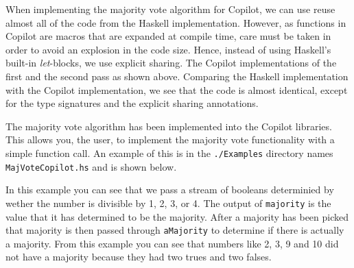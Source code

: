  


When implementing the majority vote algorithm for Copilot, we can use reuse
almost all of the code from the Haskell implementation. However, as functions
in Copilot are macros that are expanded at compile time, care must
be taken in order to avoid an explosion in the code size. Hence, instead of
using Haskell's built-in \emph{let}-blocks, we use explicit sharing. The Copilot implementations
of the first and the second pass as shown above. Comparing the Haskell implementation
with the Copilot implementation, we see that the code is almost identical,
except for the type signatures and the explicit sharing annotations.


The majority vote algorithm has been implemented into the Copilot libraries. This allows you, the user, to implement the majority vote functionality with a simple function call. An example of this is in the {\tt ./Examples} directory names {\tt MajVoteCopilot.hs} and is shown below.




In this example you can see that we pass a stream of booleans determinied by wether the number is divisible by 1, 2, 3, or 4. The output of {\tt majority} is the value that it has determined to be the majority. After a majority has been picked that majority is then passed through {\tt aMajority} to determine if there is actually a majority. From this example you can see that numbers like 2, 3, 9 and 10 did not have a majority because they had two trues and two falses.  
